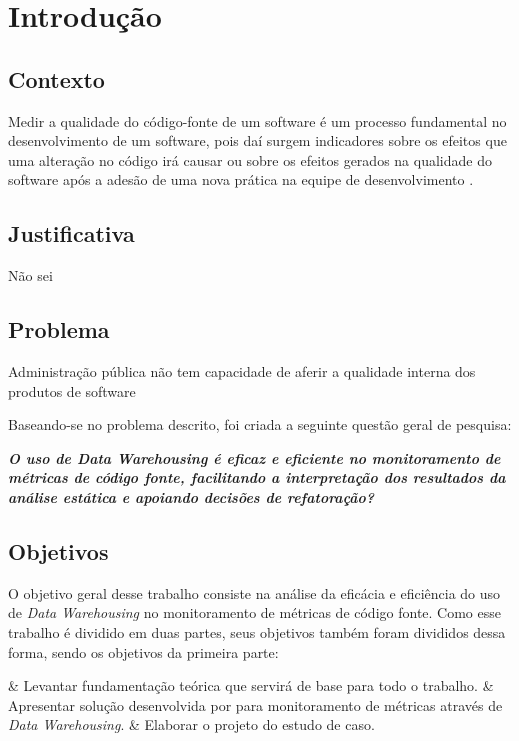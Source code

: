 \chapter{Introdução}

\section{Contexto}

Medir a qualidade do código-fonte  de um software é um processo fundamental no desenvolvimento de um software, pois daí surgem indicadores sobre os efeitos que uma alteração no código irá causar ou sobre os efeitos gerados na qualidade do software após a adesão de uma nova prática na equipe de desenvolvimento \cite{Fenton98}.



\section{Justificativa}

Não sei

\section{Problema}

Administração pública não tem capacidade de aferir a qualidade interna dos produtos de software

Baseando-se no problema descrito, foi criada a seguinte questão geral de pesquisa:

\textbf{\textit{O uso de \textit{Data Warehousing} é eficaz e eficiente no monitoramento de métricas de código fonte, facilitando a interpretação dos resultados da análise estática e apoiando decisões de refatoração?} }

\section{Objetivos}

O objetivo geral desse trabalho consiste na análise da eficácia e eficiência do uso de \textit{Data Warehousing} no monitoramento de métricas de código fonte. Como esse trabalho é dividido em duas partes, seus objetivos também foram divididos dessa forma, sendo os objetivos da primeira parte:

\begin{easylist}[itemize]	
	
	& Levantar fundamentação teórica que servirá de base para todo o trabalho.
	& Apresentar solução desenvolvida por  para monitoramento de métricas através de \textit{Data Warehousing}. 
	& Elaborar o projeto do estudo de caso.
	
	\end{easylist}	

